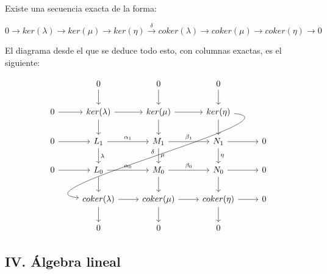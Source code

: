 \documentclass[11pt]{article}
\begin{document}
\begin{itemize}
\begin{theorem}
Existe una secuencia exacta de la forma:

\[ 0 \overset{}\longrightarrow 
 ker(\lambda) \overset{}\longrightarrow 
 ker(\mu) \overset{}\longrightarrow 
 ker(\eta) \overset{\delta}\longrightarrow 
 coker(\lambda) \overset{}\longrightarrow 
 coker(\mu) \overset{}\longrightarrow 
 coker(\eta) \overset{}\longrightarrow 
 0\]
\end{theorem}

El diagrama desde el que se deduce todo esto, con columnas exactas, es
el siguiente:

\[ \begin{tikzcd}
	& 0 \dar              & 0 \dar            & 0 \dar           &   \\
 0 \rar & ker(\lambda) \rar \dar  & ker(\mu) \rar \dar    & ker(\eta) \dar \ar[out=355, in=175,looseness=1, overlay, swap]{dddll}{\delta}       &   \\
 0 \rar & L_1 \rar{\alpha_1} \dar{\lambda}  & M_1 \rar{\beta_1} \dar{\mu} & N_1 \rar \dar{\eta}        & 0 \\
 0 \rar & L_0 \rar{\alpha_0} \dar & M_0 \rar{\beta_0} \dar & N_0 \rar \dar        & 0 \\
	& coker(\lambda) \rar \dar & coker(\mu) \rar \dar  & coker(\eta) \rar \dar & 0 \\
	& 0                   & 0                 & 0                &
 \end{tikzcd} \]
\end{itemize}

\subsection*{IV. Álgebra lineal}
\label{sec-4-2}
\end{document}
